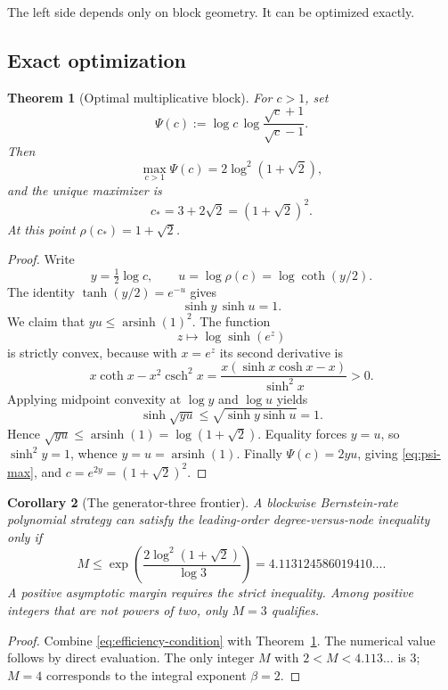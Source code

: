 \documentclass[11pt,oneside]{article}
\newtheorem{theorem}{Theorem}[section]
\newtheorem{corollary}[theorem]{Corollary}
\theoremstyle{definition}
\theoremstyle{remark}
\newcommand{\arsinh}{\operatorname{arsinh}}
\begin{document}
The left side depends only on block geometry.  It can be optimized exactly.

\subsection{Exact optimization}

\begin{theorem}[Optimal multiplicative block]
\label{thm:optimal-block}
For $c>1$, set
\[
 \Psi(c):=\log c\,\log\frac{\sqrt c+1}{\sqrt c-1}.
\]
Then
\begin{equation}
 \max_{c>1}\Psi(c)=2\log^2(1+\sqrt2),
 \label{eq:psi-max}
\end{equation}
and the unique maximizer is
\begin{equation}
 c_*=3+2\sqrt2=(1+\sqrt2)^2.
 \label{eq:cstar}
\end{equation}
At this point $\rho(c_*)=1+\sqrt2$.
\end{theorem}

\begin{proof}
Write
\[
 y=\tfrac12\log c,
 \qquad
 u=\log\rho(c)=\log\coth(y/2).
\]
The identity $\tanh(y/2)=e^{-u}$ gives
\[
 \sinh y\,\sinh u=1.
\]
We claim that $yu\le\arsinh(1)^2$.  The function
\[
 z\longmapsto \log\sinh(e^z)
\]
is strictly convex, because with $x=e^z$ its second derivative is
\[
 x\coth x-x^2\operatorname{csch}^2x
 =\frac{x(\sinh x\cosh x-x)}{\sinh^2x}>0.
\]
Applying midpoint convexity at $\log y$ and $\log u$ yields
\[
 \sinh\sqrt{yu}
 \le\sqrt{\sinh y\sinh u}=1.
\]
Hence $\sqrt{yu}\le\arsinh(1)=\log(1+\sqrt2)$.  Equality forces $y=u$,
so $\sinh^2y=1$, whence $y=u=\arsinh(1)$.  Finally
$\Psi(c)=2yu$, giving \eqref{eq:psi-max}, and
$c=e^{2y}=(1+\sqrt2)^2$.
\end{proof}

\begin{corollary}[The generator-three frontier]
\label{cor:M3-frontier}
A blockwise Bernstein-rate polynomial strategy can satisfy the leading-order
degree-versus-node inequality only if
\begin{equation}
 M\le\exp\!\left(\frac{2\log^2(1+\sqrt2)}{\log3}\right)
 =4.113124586019410\ldots.
 \label{eq:Mcritical}
\end{equation}
A positive asymptotic margin requires the strict inequality.  Among positive integers that
are not powers of two, only $M=3$ qualifies.
\end{corollary}

\begin{proof}
Combine \eqref{eq:efficiency-condition} with Theorem~\ref{thm:optimal-block}.  The numerical
value follows by direct evaluation.  The only integer $M$ with $2<M<4.113\ldots$ is $3$;
$M=4$ corresponds to the integral exponent $\beta=2$.
\end{proof}
\end{document}
